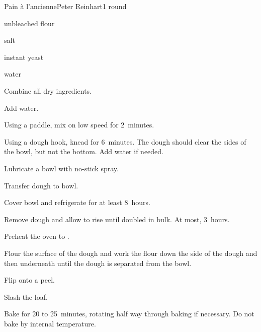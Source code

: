 \begin{recipe}{Pain à l'ancienne}{Peter Reinhart}{1 round}

\begin{ingredients}
\item {} unbleached flour
\item {} salt
\item {} instant yeast
\item {} water
\end{ingredients}

\begin{directions}
\item Combine all dry ingredients.
\item Add water.
\item Using a paddle, mix on low speed for 2~minutes.
\item Using a dough hook, knead for 6~minutes. The dough should clear the sides of the bowl, but not the bottom. Add water if needed.
\item Lubricate a bowl with no-stick spray.
\item Transfer dough to bowl.
\item Cover bowl and refrigerate for at least 8~hours.
\item Remove dough and allow to rise until doubled in bulk. At most, 3~hours.
\item Preheat the oven to .
\item Flour the surface of the dough and work the flour down the side of the dough and then underneath until the dough is separated from the bowl.
\item Flip onto a peel.
\item Slash the loaf.
\item Bake for 20 to 25~minutes, rotating half way through baking if necessary. Do not bake by internal temperature.
\end{directions}

\end{recipe}
